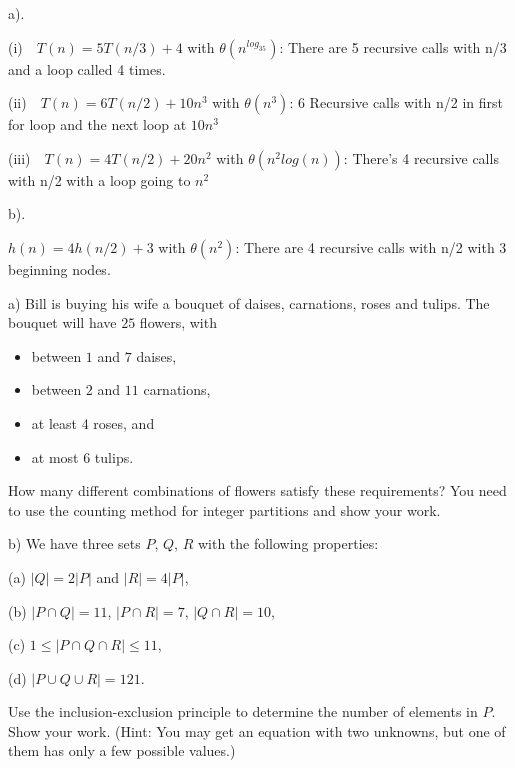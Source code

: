 \documentclass{article}
\begin{document}
\bigskip
\bigskip
\begin{solution}

\noindent
a).

(i)\ \ 
$T(n) = 5T(n/3) + 4$  with $\theta(n^{log_35})$:
There are 5 recursive calls with n/3 and a loop called 4 times.

\smallskip
(ii)\ \ 
$T(n) = 6T(n/2) + 10n^{3}$ with $\theta(n^{3})$:
6 Recursive calls with n/2 in first for loop and the next loop at
$10n^{3}$ 

\smallskip
(iii)\ \ 
$T(n) = 4T(n/2) + 20n^{2}$ with $\theta(n^{2}log(n))$:
There's 4 recursive calls with n/2 with a loop going to $n^{2}$

\smallskip
\noindent
b).

$h(n) = 4h(n/2) + 3$ with $\theta(n^{2})$:
There are 4 recursive calls with n/2 with 3 beginning nodes.
\end{solution}
\begin{problem}
a) Bill is buying his wife a bouquet of daises, carnations, roses and tulips. 
The bouquet will have $25$ flowers, with 
%
\begin{itemize} 
		\item between $1$ and $7$ daises,
        \item between $2$ and $11$ carnations,
		\item at least $4$ roses, and
		\item at most $6$ tulips. 
\end{itemize}
%
How many different combinations of flowers satisfy these requirements?
You need to use the counting method for integer partitions and show your work.



\bigskip
\noindent 
b) We have three sets $P$, $Q$, $R$
with the following properties:

\begin{description}

\item{(a)}  $|Q| = 2|P|$ and 
                $|R| = 4|P|$,

\item{(b)} $|P\cap Q| = 11$,
        $|P\cap R| = 7$,
        $|Q\cap R| = 10$,

\item{(c)}
$1\le |P\cap Q\cap R| \le 11$,

\item{(d)}
$|P\cup Q\cup R| = 121$.

\end{description}

Use the inclusion-exclusion principle to
determine the number of elements in $P$.
Show your work.
(Hint: You may get an equation with two unknowns, but one of them has only a few possible values.)
\end{problem}
\end{document}
